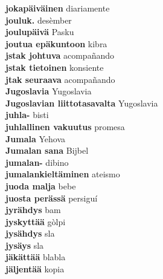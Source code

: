 \textbf{ jokapäiväinen  } diariamente \\
\textbf{ jouluk.  } desèmber \\
\textbf{ joulupäivä  } Pasku \\
\textbf{ joutua epäkuntoon  } kibra \\
\textbf{ jstak johtuva  } acompañando \\
\textbf{ jstak tietoinen  } konsiente \\
\textbf{ jtak seuraava  } acompañando \\
\textbf{ Jugoslavia  } Yugoslavia \\
\textbf{ Jugoslavian liittotasavalta  } Yugoslavia \\
\textbf{ juhla-  } bisti \\
\textbf{ juhlallinen vakuutus  } promesa \\
\textbf{ Jumala  } Yehova \\
\textbf{ Jumalan sana  } Bijbel \\
\textbf{ jumalan-  } dibino \\
\textbf{ jumalankieltäminen  } ateismo \\
\textbf{ juoda malja  } bebe \\
\textbf{ juosta perässä  } persiguí \\
\textbf{ jyrähdys  } bam \\
\textbf{ jyskyttää  } gòlpi \\
\textbf{ jysähdys  } sla \\
\textbf{ jysäys  } sla \\
\textbf{ jäkättää  } blabla \\
\textbf{ jäljentää  } kopia \\
